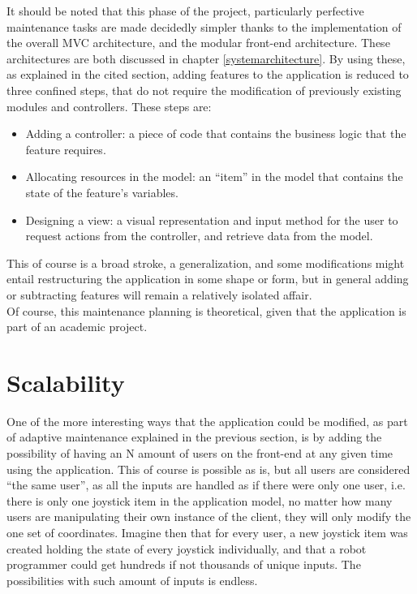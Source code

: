 It should be noted that this phase of the project, particularly perfective maintenance tasks are made decidedly simpler thanks 
to the implementation of the overall MVC architecture, and the modular front-end architecture. These architectures are both 
discussed in chapter \ref{systemarchitecture}. By using these, as explained in the cited section, adding features to the 
application is reduced to three confined steps, that do not require the modification of previously existing modules and 
controllers. These steps are:
\begin{itemize}
	\item Adding a controller: a piece of code that contains the business logic that the feature requires.
	\item Allocating resources in the model: an ``item'' in the model that contains the state of the feature's variables.
	\item Designing a view: a visual representation and input method for the user to request actions from the controller, and 
	retrieve data from the model.
\end{itemize}
This of course is a broad stroke, a generalization, and some modifications might entail restructuring the application in some shape 
or form, but in general adding or subtracting features will remain a relatively isolated affair.\\

Of course, this maintenance planning is theoretical, given that the application is part of an academic project.
\section{Scalability} \label{scalability}
One of the more interesting ways that the application could be modified, as part of adaptive maintenance explained in the previous 
section, is by adding the possibility of having an N amount of users on the front-end at any given time using the application. This 
of course is possible as is, but all users are considered ``the same user'', as all the inputs are handled as if there were only 
one user, i.e. there is only one joystick item in the application model, no matter how many users are manipulating their own 
instance of the client, they will only modify the one set of coordinates. Imagine then that for every user, a new joystick item was 
created holding the state of every joystick individually, and that a robot programmer could get hundreds if not thousands of unique 
inputs. The possibilities with such amount of inputs is endless.\\

